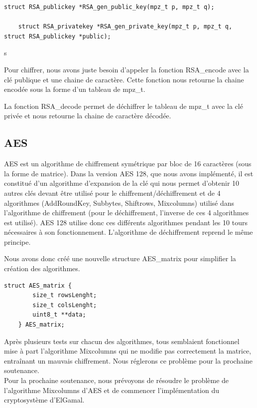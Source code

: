       \begin{lstlisting}[style=CStyle]
    struct RSA_publickey *RSA_gen_public_key(mpz_t p, mpz_t q);
    
    struct RSA_privatekey *RSA_gen_private_key(mpz_t p, mpz_t q, struct RSA_publickey *public);
		\end{lstlisting}s

        Pour chiffrer, nous avons juste besoin d’appeler la fonction RSA\_encode avec la clé publique et une chaine de caractère. Cette fonction nous retourne la chaine encodée sous la forme d’un tableau de mpz\_t.

        La fonction RSA\_decode permet de déchiffrer le tableau de mpz\_t avec la clé privée et nous retourne la chaine de caractère décodée. \\


	\subsection{AES}
        AES est un algorithme de chiffrement symétrique par bloc de 16 caractères (sous la forme de matrice). Dans la version AES 128, que nous avons implémenté, il est constitué d’un algorithme d’expansion de la clé qui nous permet d’obtenir 10 autres clés devant être utilisé pour le chiffrement/déchiffrement et de 4 algorithmes (AddRoundKey, Subbytes, Shiftrows, Mixcolumns) utilisé dans l’algorithme de chiffrement (pour le déchiffrement, l’inverse de ces 4 algorithmes est utilisé).
        AES 128 utilise donc ces différents algorithmes pendant les 10 tours nécessaires à son fonctionnement.
        L’algorithme de déchiffrement reprend le même principe.

        Nous avons donc créé une nouvelle structure AES\_matrix pour simplifier la création des algorithmes.

        \begin{lstlisting}[style=CStyle]
    struct AES_matrix {
        size_t rowsLenght;
        size_t colsLenght;
        uint8_t **data;
    } AES_matrix;
		\end{lstlisting}	


        Après plusieurs tests sur chacun des algorithmes, tous semblaient fonctionnel mise à part l’algorithme Mixcolumns qui ne modifie pas correctement la matrice, entraînant un mauvais chiffrement.
        Nous réglerons ce problème pour la prochaine soutenance. \\

        Pour la prochaine soutenance, nous prévoyons de résoudre le problème de l’algorithme Mixcolumns d’AES et de commencer l’implémentation du cryptosystème d'ElGamal. \\
\newpage

